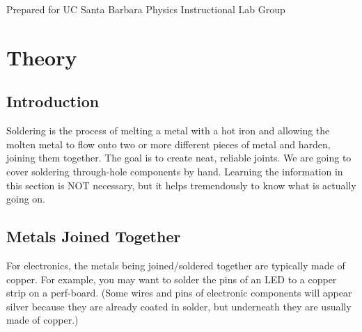 

\maketitle

\noindent Prepared for UC Santa Barbara Physics Instructional Lab Group

\section{Theory}
\subsection{Introduction}
Soldering is the process of melting a metal with a hot iron and allowing the molten metal to flow onto two or more different pieces of metal and harden, joining them together. The goal is to create neat, reliable joints. We are going to cover soldering through-hole components by hand. Learning the information in this section is NOT necessary, but it helps tremendously to know what is actually going on.

\subsection{Metals Joined Together}
For electronics, the metals being joined/soldered together are typically made of copper. For example, you may want to solder the pins of an LED to a copper strip on a perf-board. (Some wires and pins of electronic components will appear silver because they are already coated in solder, but underneath they are usually made of copper.)

